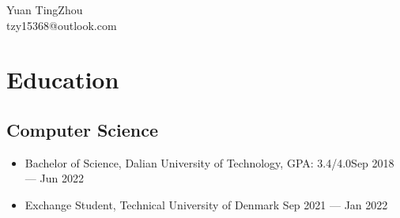 \documentclass[a4,10pt]{article}
\newcommand{\subtext}[1]{
#1\par\vspace{-0.2cm}}
\newenvironment{zitemize}{
\begin{itemize}\itemsep0pt \parskip0pt \parsep1pt}
{\end{itemize}\vspace{-0.5cm}}
\newcommand{\hskills}[1]{
\textbf{\bfseries #1} }
\begin{document}
\begin{center}
    \begin{minipage}[b]{0.5\textwidth}
            \centering
            {\huge Yuan TingZhou} \\ %
            \vspace{0.1cm}
            tzy15368@outlook.com
    \end{minipage}%
    
\vspace{-0.35cm} 
\end{center}

\section{Education}

\subsection*{Computer Science}
\begin{zitemize}
    \item
        \subtext{Bachelor of Science, Dalian University of Technology, GPA: 3.4/4.0\hfill Sep 2018 --- Jun 2022}
        \vspace{0.1cm}
    \item
        \subtext{Exchange Student, Technical University of Denmark \hfill Sep 2021 --- Jan 2022}
        \vspace{0.1cm}
\end{zitemize}
\end{document}
